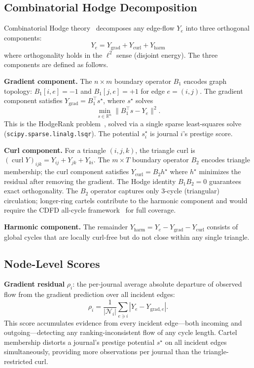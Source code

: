 \documentclass[twocolumn,11pt,letterpaper]{article}
\begin{document}
\subsection{Combinatorial Hodge Decomposition}

Combinatorial Hodge theory~\cite{Jiang2008} decomposes any edge-flow $Y_e$
into three orthogonal components:
\begin{equation}
  Y_e = Y_{\mathrm{grad}} + Y_{\mathrm{curl}} + Y_{\mathrm{harm}}
  \label{eq:hodge}
\end{equation}
where orthogonality holds in the $\ell^2$ sense (disjoint energy). The three
components are defined as follows.

\smallskip\noindent\textbf{Gradient component.} The $n \times m$ boundary
operator $B_1$ encodes graph topology: $B_1[i,e] = -1$ and $B_1[j,e] = +1$
for edge $e = (i,j)$. The gradient component satisfies
$Y_{\mathrm{grad}} = B_1^\top s^\star$, where $s^\star$ solves
\begin{equation}
  \min_{s \in \mathbb{R}^n} \|B_1^\top s - Y_e\|^2.
  \label{eq:hodgerank}
\end{equation}
This is the HodgeRank problem~\cite{Jiang2008}, solved via a single sparse
least-squares solve (\texttt{scipy.sparse.linalg.lsqr}). The potential
$s^\star_i$ is journal $i$'s prestige score.

\smallskip\noindent\textbf{Curl component.} For a triangle $(i,j,k)$, the
triangle curl is $(\operatorname{curl} Y)_{ijk} = Y_{ij} + Y_{jk} + Y_{ki}$.
The $m \times T$ boundary operator $B_2$ encodes triangle membership; the curl
component satisfies $Y_{\mathrm{curl}} = B_2 h^\star$ where $h^\star$
minimizes the residual after removing the gradient. The Hodge identity
$B_1 B_2 = 0$ guarantees exact orthogonality. The $B_2$ operator captures
only 3-cycle (triangular) circulation; longer-ring cartels contribute to the
harmonic component and would require the CDFD all-cycle framework~\cite{HomsDones2025}
for full coverage.

\smallskip\noindent\textbf{Harmonic component.} The remainder
$Y_{\mathrm{harm}} = Y_e - Y_{\mathrm{grad}} - Y_{\mathrm{curl}}$ consists of
global cycles that are locally curl-free but do not close within any single
triangle.

\subsection{Node-Level Scores}

\textbf{Gradient residual} $\rho_i$: the per-journal average absolute
departure of observed flow from the gradient prediction over all incident
edges:
\begin{equation}
  \rho_i = \frac{1}{|\mathcal{N}_i|} \sum_{e \ni i} |Y_e - Y_{\mathrm{grad},e}|.
\end{equation}
This score accumulates evidence from every incident edge---both incoming and
outgoing---detecting any ranking-inconsistent flow of any cycle length. Cartel
membership distorts a journal's prestige potential $s^\star$ on all incident
edges simultaneously, providing more observations per journal than the
triangle-restricted curl.
\end{document}
